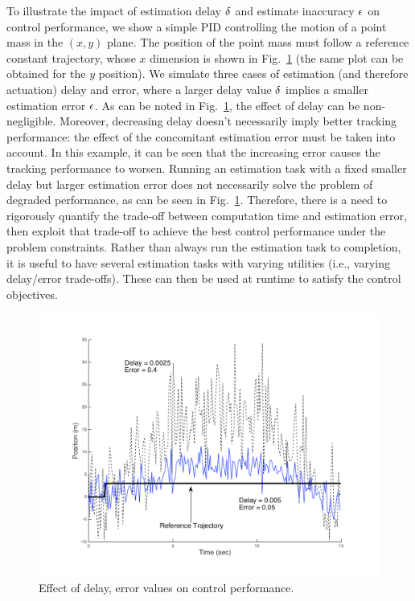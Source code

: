 \begin{exmp}
\label{motivatingExample}
To illustrate the impact of estimation delay $\delta$ and estimate inaccuracy $\epsilon$ on control performance, we show a simple PID controlling the motion of a point mass in the $(x,y)$ plane.
The position of the point mass must follow a reference constant trajectory, whose $x$ dimension is shown in Fig.~\ref{fig:toyplot} (the same plot can be obtained for the $y$ position).
We simulate three cases of estimation (and therefore actuation) delay and error, where a larger delay value $\delta$ implies a smaller estimation error $\epsilon$.
As can be noted in Fig.~\ref{fig:toyplot}, the effect of delay can be non-negligible.
Moreover, decreasing delay doesn't necessarily imply better tracking performance: the effect of the concomitant estimation error must be taken into account. 
In this example, it can be seen that the increasing error causes the tracking performance to worsen.
Running an estimation task with a fixed smaller delay but larger estimation error does not necessarily solve the problem of degraded performance, as can be seen in Fig.~\ref{fig:toyplot}.
Therefore, there is a need to rigorously quantify the trade-off between computation time and estimation error, then exploit that trade-off to achieve the best control performance under the problem constraints.
Rather than always run the estimation task to completion, it is useful to have several estimation tasks with varying utilities (i.e., varying delay/error trade-offs).
These can then be used at runtime to satisfy the control objectives.
\exmend

\begin{figure}[t]
\centering
\includegraphics[scale=0.3]{figures/toyplot}
\vspace{-10pt}
\caption{Effect of delay, error values on control performance.}
\vspace{-10pt}
\label{fig:toyplot}
\end{figure}
\end{exmp}

